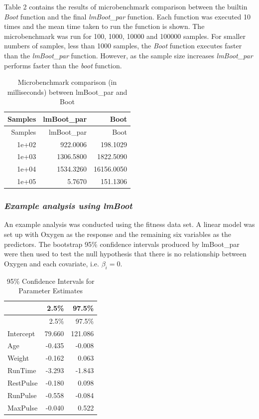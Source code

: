 \documentclass[]{article}
\begin{document}
Table 2 contains the results of microbenchmark comparison between the
builtin \emph{Boot} function and the final \emph{lmBoot\_par} function.
Each function was executed 10 times and the mean time taken to run the
function is shown. The microbenchmark was run for 100, 1000, 10000 and
100000 samples. For smaller numbers of samples, less than 1000 samples,
the \emph{Boot} function executes faster than the \emph{lmBoot\_par}
function. However, as the sample size increases \emph{lmBoot\_par}
performs faster than the \emph{boot} function.

\begin{longtable}[]{@{}rrr@{}}
\caption{Microbenchmark comparison (in milliseconds) between lmBoot\_par
and Boot}\tabularnewline
\toprule
Samples & lmBoot\_par & Boot\tabularnewline
\midrule
\endfirsthead
\toprule
Samples & lmBoot\_par & Boot\tabularnewline
\midrule
\endhead
1e+02 & 922.0006 & 198.1029\tabularnewline
1e+03 & 1306.5800 & 1822.5090\tabularnewline
1e+04 & 1534.3260 & 16156.0050\tabularnewline
1e+05 & 5.7670 & 151.1306\tabularnewline
\bottomrule
\end{longtable}

\subsubsection{\texorpdfstring{\emph{Example analysis using
lmBoot}}{Example analysis using lmBoot}}\label{example-analysis-using-lmboot}

An example analysis was conducted using the fitness data set. A linear
model was set up with Oxygen as the response and the remaining six
variables as the predictors. The bootstrap 95\% confidence intervals
produced by lmBoot\_par were then used to test the null hypothesis that
there is no relationship between Oxygen and each covariate, i.e.
\(\beta_i = 0\).

\begin{longtable}[]{@{}lrr@{}}
\caption{95\% Confidence Intervals for Parameter
Estimates}\tabularnewline
\toprule
& 2.5\% & 97.5\%\tabularnewline
\midrule
\endfirsthead
\toprule
& 2.5\% & 97.5\%\tabularnewline
\midrule
\endhead
Intercept & 79.660 & 121.086\tabularnewline
Age & -0.435 & -0.008\tabularnewline
Weight & -0.162 & 0.063\tabularnewline
RunTime & -3.293 & -1.843\tabularnewline
RestPulse & -0.180 & 0.098\tabularnewline
RunPulse & -0.558 & -0.084\tabularnewline
MaxPulse & -0.040 & 0.522\tabularnewline
\bottomrule
\end{longtable}
\end{document}
